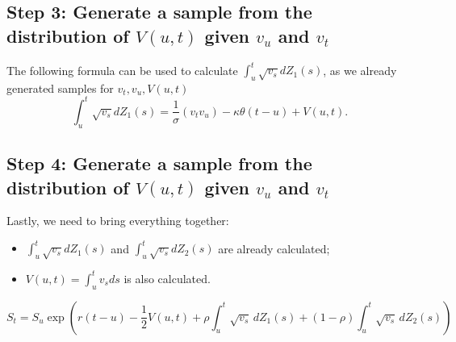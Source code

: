         \subsection*{Step 3: Generate a sample from the distribution of $V(u, t)$ given $v_u$ and $v_t$}
            The following formula can be used to calculate $\int_{u}^t \sqrt{v_s} dZ_1(s)$, as we already generated samples for $v_t , v_u, V(u, t)$
            \begin{equation}
                \int_{u}^t \sqrt{v_s} dZ_1(s) = \frac{1}{\sigma}(v_t v_u) - \kappa\theta(t-u) + V(u, t).
            \end{equation}

        \subsection*{Step 4: Generate a sample from the distribution of $V(u, t)$ given $v_u$ and $v_t$}
            Lastly, we need to bring everything together:
            \begin{itemize}
                \item $\int_{u}^t \sqrt{v_s} dZ_1(s)$ and $\int_{u}^t \sqrt{v_s} dZ_2(s)$ are already calculated;
                \item $V(u, t) = \int_{u}^t v_s ds $ is also calculated.
            \end{itemize}
            \begin{equation}
                S_t = S_u \exp{\left( r(t-u)-\frac{1}{2} V(u, t)  + \rho\int_{u}^{t} \sqrt{v_s} \, dZ_1(s) + (1-\rho)\int_{u}^{t} \sqrt{v_s} \, dZ_2(s)  \right)}
            \end{equation}